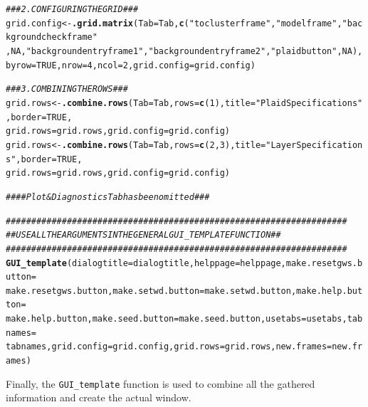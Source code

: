 \documentclass[a4paper]{article}\usepackage[]{graphicx}\usepackage[]{color}
\makeatletter
\newcommand{\hlnum}[1]{\textcolor[rgb]{0.686,0.059,0.569}{#1}}%
\newcommand{\hlstr}[1]{\textcolor[rgb]{0.192,0.494,0.8}{#1}}%
\newcommand{\hlcom}[1]{\textcolor[rgb]{0.678,0.584,0.686}{\textit{#1}}}%
\newcommand{\hlstd}[1]{\textcolor[rgb]{0.345,0.345,0.345}{#1}}%
\newcommand{\hlkwb}[1]{\textcolor[rgb]{0.69,0.353,0.396}{#1}}%
\newcommand{\hlkwc}[1]{\textcolor[rgb]{0.333,0.667,0.333}{#1}}%
\newcommand{\hlkwd}[1]{\textcolor[rgb]{0.737,0.353,0.396}{\textbf{#1}}}%
\newenvironment{kframe}{%
 \def\at@end@of@kframe{}%
 \ifinner\ifhmode%
  \def\at@end@of@kframe{\end{minipage}}%
  \begin{minipage}{\columnwidth}%
 \fi\fi%
 \def\FrameCommand##1{\hskip\@totalleftmargin \hskip-\fboxsep
 \colorbox{shadecolor}{##1}\hskip-\fboxsep
     \hskip-\linewidth \hskip-\@totalleftmargin \hskip\columnwidth}%
 \MakeFramed {\advance\hsize-\width
   \@totalleftmargin\z@ \linewidth\hsize
   \@setminipage}}%
 {\par\unskip\endMakeFramed%
 \at@end@of@kframe}
\newenvironment{knitrout}{}{} %
\makeatother
\begin{document}
\begin{knitrout}
\color{fgcolor}\begin{kframe}
\begin{alltt}
\hlcom{### 2. CONFIGURING THE GRID ###}
\hlstd{grid.config} \hlkwb{<-} \hlkwd{.grid.matrix}\hlstd{(}\hlkwc{Tab}\hlstd{=Tab,}\hlkwd{c}\hlstd{(}\hlstr{"toclusterframe"}\hlstd{,}\hlstr{"modelframe"}\hlstd{,}\hlstr{"backgroundcheckframe"}
                \hlstd{,}\hlnum{NA}\hlstd{,}\hlstr{"backgroundentryframe1"}\hlstd{,}\hlstr{"backgroundentryframe2"}\hlstd{,}\hlstr{"plaidbutton"}\hlstd{,}\hlnum{NA}\hlstd{),}
                \hlkwc{byrow}\hlstd{=}\hlnum{TRUE}\hlstd{,}\hlkwc{nrow}\hlstd{=}\hlnum{4}\hlstd{,}\hlkwc{ncol}\hlstd{=}\hlnum{2}\hlstd{,}\hlkwc{grid.config}\hlstd{=grid.config)}


\hlcom{### 3. COMBINING THE ROWS ###}
\hlstd{grid.rows} \hlkwb{<-} \hlkwd{.combine.rows}\hlstd{(}\hlkwc{Tab}\hlstd{=Tab,}\hlkwc{rows}\hlstd{=}\hlkwd{c}\hlstd{(}\hlnum{1}\hlstd{),}\hlkwc{title}\hlstd{=}\hlstr{"Plaid Specifications"}\hlstd{,}\hlkwc{border}\hlstd{=}\hlnum{TRUE}\hlstd{,}
                \hlkwc{grid.rows}\hlstd{=grid.rows,}\hlkwc{grid.config}\hlstd{=grid.config)}
\hlstd{grid.rows} \hlkwb{<-} \hlkwd{.combine.rows}\hlstd{(}\hlkwc{Tab}\hlstd{=Tab,}\hlkwc{rows}\hlstd{=}\hlkwd{c}\hlstd{(}\hlnum{2}\hlstd{,}\hlnum{3}\hlstd{),}\hlkwc{title}\hlstd{=}\hlstr{"Layer Specifications"}\hlstd{,}\hlkwc{border}\hlstd{=}\hlnum{TRUE}\hlstd{,}
                \hlkwc{grid.rows}\hlstd{=grid.rows,}\hlkwc{grid.config}\hlstd{=grid.config)}


\hlcom{#### Plot & Diagnostics Tab has been omitted ###}


\hlcom{###################################################################}
\hlcom{## USE ALL THE ARGUMENTS IN THE GENERAL GUI_TEMPLATE FUNCTION    ##}
\hlcom{###################################################################}
\hlkwd{GUI_template}\hlstd{(}\hlkwc{dialogtitle}\hlstd{=dialogtitle,}\hlkwc{helppage}\hlstd{=helppage,}\hlkwc{make.resetgws.button}\hlstd{=}
        \hlstd{make.resetgws.button,}\hlkwc{make.setwd.button}\hlstd{=make.setwd.button,}\hlkwc{make.help.button}\hlstd{=}
        \hlstd{make.help.button,}\hlkwc{make.seed.button}\hlstd{=make.seed.button,}\hlkwc{usetabs}\hlstd{=usetabs,}\hlkwc{tabnames}\hlstd{=}
        \hlstd{tabnames,}\hlkwc{grid.config}\hlstd{=grid.config,}\hlkwc{grid.rows}\hlstd{=grid.rows,}\hlkwc{new.frames}\hlstd{=new.frames)}
\end{alltt}
\end{kframe}
\end{knitrout}
\noindent Finally, the \verb|GUI_template| function is used to combine all the
gathered information and create the actual window.
\end{document}
